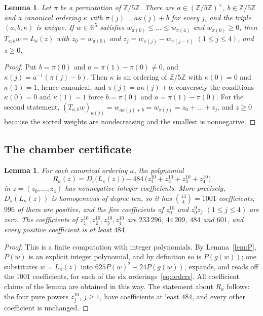 \documentclass[11pt,a4paper]{article}
\newtheorem{lemma}[theorem]{Lemma}
\theoremstyle{definition}
\theoremstyle{remark}
\newcommand{\R}{\mathbb{R}}
\newcommand{\Z}{\mathbb{Z}}
\begin{document}
\begin{lemma}\label{lem:chambers}
Let $\pi$ be a permutation of $\Z/5\Z$. There are $a\in(\Z/5\Z)^\times$, $b\in\Z/5\Z$ and a canonical ordering
$\kappa$ with $\pi(j)=a\kappa(j)+b$ for every $j$, and the triple $(a,b,\kappa)$ is unique. If $w\in\R^5$ satisfies
$w_{\pi(0)}\le\dots\le w_{\pi(4)}$ and $w_{\pi(0)}\ge0$, then $T_{a,b}w=L_\kappa(z)$ with $z_0=w_{\pi(0)}$ and
$z_j=w_{\pi(j)}-w_{\pi(j-1)}$ $(1\le j\le4)$, and $z\ge0$.
\end{lemma}

\begin{proof}
Put $b=\pi(0)$ and $a=\pi(1)-\pi(0)\ne0$, and $\kappa(j)=a^{-1}(\pi(j)-b)$. Then $\kappa$ is an ordering of
$\Z/5\Z$ with $\kappa(0)=0$ and $\kappa(1)=1$, hence canonical, and $\pi(j)=a\kappa(j)+b$; conversely the conditions
$\kappa(0)=0$ and $\kappa(1)=1$ force $b=\pi(0)$ and $a=\pi(1)-\pi(0)$. For the second statement,
$(T_{a,b}w)_{\kappa(j)}=w_{a\kappa(j)+b}=w_{\pi(j)}=z_0+\dots+z_j$, and $z\ge0$ because the sorted weights are
nondecreasing and the smallest is nonnegative.
\end{proof}

\subsection{The chamber certificate}

\begin{lemma}\label{lem:certificate}
For each canonical ordering $\kappa$, the polynomial
\[
R_\kappa(z)=D_s\bigl(L_\kappa(z)\bigr)-484\,\bigl(z_1^{10}+z_2^{10}+z_3^{10}+z_4^{10}\bigr)
\]
in $z=(z_0,\dots,z_4)$ has nonnegative integer coefficients. More precisely, $D_s(L_\kappa(z))$ is homogeneous of degree
ten, so it has $\binom{14}{4}=1001$ coefficients; $996$ of them are positive, and the five coefficients of $z_0^{10}$ and
$z_0^9z_j$ $(1\le j\le4)$ are zero. The coefficients of $z_1^{10},z_2^{10},z_3^{10},z_4^{10}$ are
$233\,296$, $44\,209$, $484$ and $601$, and every positive coefficient is at least $484$.
\end{lemma}

\begin{proof}
This is a finite computation with integer polynomials. By Lemma~\ref{lem:P}, $P(w)$ is an explicit integer polynomial,
and by definition so is $P(g(w))$; one substitutes $w=L_\kappa(z)$ into
$625P(w)^2-24P(g(w))$, expands, and reads off the $1001$ coefficients, for each of the six orderings~\eqref{eq:orders}.
All coefficient claims of the lemma are obtained in this way. The statement about $R_\kappa$ follows: the four pure
powers $z_j^{10}$, $j\ge1$, have coefficients at least $484$, and every other coefficient is unchanged.
\end{proof}
\end{document}
